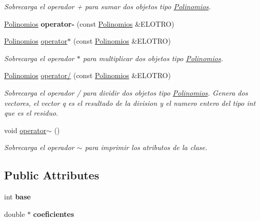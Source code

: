 \begin{DoxyCompactItemize}
\begin{DoxyCompactList}\small\item\em Sobrecarga el operador + para sumar dos objetos tipo \hyperlink{class_polinomios}{Polinomios}. \end{DoxyCompactList}\item 
\hypertarget{class_polinomios_abfe35ca12f298d22f1c8cbdf4b8a28d0}{}\label{class_polinomios_abfe35ca12f298d22f1c8cbdf4b8a28d0} 
\hyperlink{class_polinomios}{Polinomios} {\bfseries operator-\/} (const \hyperlink{class_polinomios}{Polinomios} \&E\+L\+O\+T\+RO)
\item 
\hyperlink{class_polinomios}{Polinomios} \hyperlink{class_polinomios_a2354ab7f6489e95a1373b0ae9e9d9ec0}{operator$\ast$} (const \hyperlink{class_polinomios}{Polinomios} \&E\+L\+O\+T\+RO)
\begin{DoxyCompactList}\small\item\em Sobrecarga el operador $\ast$ para multiplicar dos objetos tipo \hyperlink{class_polinomios}{Polinomios}. \end{DoxyCompactList}\item 
\hyperlink{class_polinomios}{Polinomios} \hyperlink{class_polinomios_a088a4ddc834ad371bf927f3e9be6f97d}{operator/} (const \hyperlink{class_polinomios}{Polinomios} \&E\+L\+O\+T\+RO)
\begin{DoxyCompactList}\small\item\em Sobrecarga el operador / para dividir dos objetos tipo \hyperlink{class_polinomios}{Polinomios}. Genera dos vectores, el vector q es el resultado de la division y el numero entero del tipo int que es el residuo. \end{DoxyCompactList}\item 
\hypertarget{class_polinomios_aa720fde76002a958d77a608ffd80adac}{}\label{class_polinomios_aa720fde76002a958d77a608ffd80adac} 
void \hyperlink{class_polinomios_aa720fde76002a958d77a608ffd80adac}{operator$\sim$} ()
\begin{DoxyCompactList}\small\item\em Sobrecarga el operador $\sim$ para imprimir los atributos de la clase. \end{DoxyCompactList}\end{DoxyCompactItemize}
\subsection*{Public Attributes}
\begin{DoxyCompactItemize}
\item 
\hypertarget{class_polinomios_a48fd5ea9e7d4765dc793452820c22261}{}\label{class_polinomios_a48fd5ea9e7d4765dc793452820c22261} 
int {\bfseries base}
\item 
\hypertarget{class_polinomios_a9d061d7f4271a2a35e0bf8c776f4c604}{}\label{class_polinomios_a9d061d7f4271a2a35e0bf8c776f4c604} 
double $\ast$ {\bfseries coeficientes}
\end{DoxyCompactItemize}


